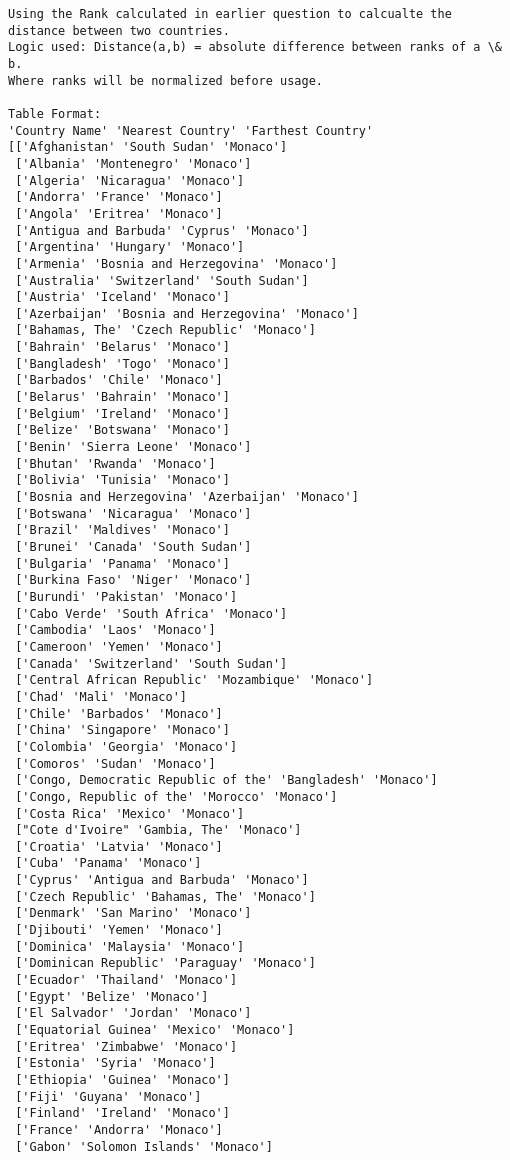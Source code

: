 \documentclass[11pt]{article}
\begin{document}
    \begin{Verbatim}[commandchars=\\\{\}]
Using the Rank calculated in earlier question to calcualte the distance between two countries.
Logic used: Distance(a,b) = absolute difference between ranks of a \& b.
Where ranks will be normalized before usage.

Table Format:
'Country Name' 'Nearest Country' 'Farthest Country'
[['Afghanistan' 'South Sudan' 'Monaco']
 ['Albania' 'Montenegro' 'Monaco']
 ['Algeria' 'Nicaragua' 'Monaco']
 ['Andorra' 'France' 'Monaco']
 ['Angola' 'Eritrea' 'Monaco']
 ['Antigua and Barbuda' 'Cyprus' 'Monaco']
 ['Argentina' 'Hungary' 'Monaco']
 ['Armenia' 'Bosnia and Herzegovina' 'Monaco']
 ['Australia' 'Switzerland' 'South Sudan']
 ['Austria' 'Iceland' 'Monaco']
 ['Azerbaijan' 'Bosnia and Herzegovina' 'Monaco']
 ['Bahamas, The' 'Czech Republic' 'Monaco']
 ['Bahrain' 'Belarus' 'Monaco']
 ['Bangladesh' 'Togo' 'Monaco']
 ['Barbados' 'Chile' 'Monaco']
 ['Belarus' 'Bahrain' 'Monaco']
 ['Belgium' 'Ireland' 'Monaco']
 ['Belize' 'Botswana' 'Monaco']
 ['Benin' 'Sierra Leone' 'Monaco']
 ['Bhutan' 'Rwanda' 'Monaco']
 ['Bolivia' 'Tunisia' 'Monaco']
 ['Bosnia and Herzegovina' 'Azerbaijan' 'Monaco']
 ['Botswana' 'Nicaragua' 'Monaco']
 ['Brazil' 'Maldives' 'Monaco']
 ['Brunei' 'Canada' 'South Sudan']
 ['Bulgaria' 'Panama' 'Monaco']
 ['Burkina Faso' 'Niger' 'Monaco']
 ['Burundi' 'Pakistan' 'Monaco']
 ['Cabo Verde' 'South Africa' 'Monaco']
 ['Cambodia' 'Laos' 'Monaco']
 ['Cameroon' 'Yemen' 'Monaco']
 ['Canada' 'Switzerland' 'South Sudan']
 ['Central African Republic' 'Mozambique' 'Monaco']
 ['Chad' 'Mali' 'Monaco']
 ['Chile' 'Barbados' 'Monaco']
 ['China' 'Singapore' 'Monaco']
 ['Colombia' 'Georgia' 'Monaco']
 ['Comoros' 'Sudan' 'Monaco']
 ['Congo, Democratic Republic of the' 'Bangladesh' 'Monaco']
 ['Congo, Republic of the' 'Morocco' 'Monaco']
 ['Costa Rica' 'Mexico' 'Monaco']
 ["Cote d'Ivoire" 'Gambia, The' 'Monaco']
 ['Croatia' 'Latvia' 'Monaco']
 ['Cuba' 'Panama' 'Monaco']
 ['Cyprus' 'Antigua and Barbuda' 'Monaco']
 ['Czech Republic' 'Bahamas, The' 'Monaco']
 ['Denmark' 'San Marino' 'Monaco']
 ['Djibouti' 'Yemen' 'Monaco']
 ['Dominica' 'Malaysia' 'Monaco']
 ['Dominican Republic' 'Paraguay' 'Monaco']
 ['Ecuador' 'Thailand' 'Monaco']
 ['Egypt' 'Belize' 'Monaco']
 ['El Salvador' 'Jordan' 'Monaco']
 ['Equatorial Guinea' 'Mexico' 'Monaco']
 ['Eritrea' 'Zimbabwe' 'Monaco']
 ['Estonia' 'Syria' 'Monaco']
 ['Ethiopia' 'Guinea' 'Monaco']
 ['Fiji' 'Guyana' 'Monaco']
 ['Finland' 'Ireland' 'Monaco']
 ['France' 'Andorra' 'Monaco']
 ['Gabon' 'Solomon Islands' 'Monaco']

\end{Verbatim}
\end{document}
